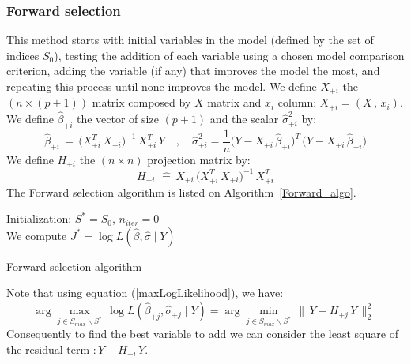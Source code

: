 \subsubsection{Forward selection}
This method starts with initial variables in the model (defined by the set of indices $S_0$), testing the addition of each variable
using a chosen model comparison criterion, adding the variable (if any) that improves the model the most, and repeating this process until none improves the model.
We define $X_{+i}$ the $(n \times (p+1))$ matrix composed by $X$ matrix and $x_i$ column: $X_{+i} = (X \,,\,x_i)$.
We define $\hat{\beta}_{+i}$ the vector of size $(p+1)$ and the scalar $\hat{\sigma}_{+i}^2$ by:
 \begin{equation}
  \hat{\beta}_{+i} \,=\, \big(X^T_{+i} \,X_{+i}\big)^{-1} \,X^T_{+i} \, Y
\quad,\quad
\hat{\sigma}_{+i}^2 = \frac{1}{n}\big(Y-X_{+i} \,\hat{\beta}_{+i}\big)^T\,\big(Y-X_{+i} \,\hat{\beta}_{+i}\big)
\end{equation}
We define $H_{+i} $ the $(n\times n)$ projection matrix by:
 \begin{equation}
\label{H+}
H_{+i}\, \,\hat{=} \, X_{+i}\,\big(X^T_{+i} \,X_{+i}\big)^{-1} \,X^T_{+i}
 \end{equation}
The Forward selection algorithm is listed on Algorithm~\ref{Forward_algo}.

\begin{algorithm}
\label{Forward_algo}
Initialization: $S^* = S_0$, $n_{iter} = 0 $\\
We compute $J^* = \log L(\hat{\beta},\hat{\sigma}\mid Y)$  \\
\caption{Forward selection algorithm }
\end{algorithm}

Note that using equation (\ref{maxLogLikelihood}), we have:
 \begin{equation}
\arg   \displaystyle\max_{j \in S_{max} \backslash S^*}\,  \log L(\hat{\beta}_{+j},\hat{\sigma}_{+j}\mid Y) =
\arg \displaystyle\min_{j \in S_{max} \backslash S^*}\, \|\,Y-H_{+j}\,Y\,\|^2_2  \,\,
 \end{equation}
Consequently to find the best variable to add we can consider the least square of the residual term $:Y-H_{+i}\,Y$.



